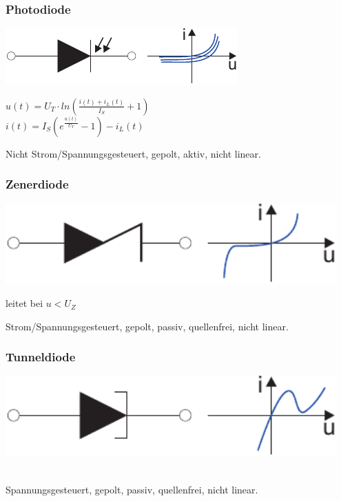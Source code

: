 \documentclass[a4paper,twocolumn,10pt]{article}
\begin{document}
\subsubsection*{Photodiode}
\begin{minipage}[b]{0.24\textwidth}
\includegraphics[width=\textwidth]{Grafiken/Photodiode}
\end{minipage}
\hfill
\begin{minipage}[b]{0.22\textwidth}
$u(t)=U_T\cdot ln(\frac{i(t)+i_L(t)}{I_S}+1)$\\
$i(t)=I_S(e^{\frac{u(t)}{U_T}}-1)-i_L(t)$
\end{minipage}
Nicht Strom/Spannungsgesteuert, gepolt, aktiv, nicht linear.

\subsubsection*{Zenerdiode}
\begin{minipage}[b]{0.26\textwidth}
\includegraphics[width=0.95\textwidth]{Grafiken/Z-Diode}
\end{minipage}
\hfill
\begin{minipage}[b]{0.2\textwidth}
leitet bei $u<U_Z$
\end{minipage}
Strom/Spannungsgesteuert, gepolt, passiv, quellenfrei, nicht linear.

\subsubsection*{Tunneldiode}
\begin{minipage}[b]{0.26\textwidth}
\includegraphics[width=0.95\textwidth]{Grafiken/Tunneldiode}
\end{minipage}
\\
Spannungsgesteuert, gepolt, passiv, quellenfrei, nicht linear.
\end{document}

